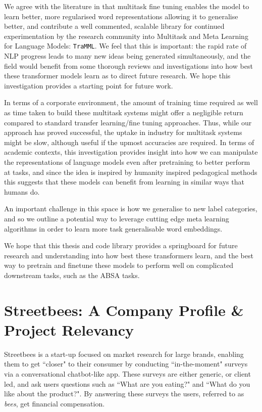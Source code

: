 \documentclass[11pt]{report}
\def \thesistitle {Multitask \& Meta Learning for Language Models}
\renewcommand{\headrulewidth}{0.4pt}
\theoremstyle{Definition}
\theoremstyle{remark}
\begin{document}
We agree with the literature in that multitask fine tuning enables the model to learn better, more regularised word representations allowing it to generalise better, and contribute a well commented, scalable library for continued experimentation by the research community into Multitask and Meta Learning for Language Models: \texttt{TraMML}. We feel that this is important: the rapid rate of NLP progress leads to many new ideas being generated simultaneously, and the field would benefit from some thorough reviews and investigations into how best these transformer models learn as to direct future research. We hope this investigation provides a starting point for future work.

In terms of a corporate environment, the amount of training time required as well as time taken to build these multitask systems might offer a negligible return compared to standard transfer learning/fine tuning approaches. Thus, while our approach has proved successful, the uptake in industry for multitask systems might be slow, although useful if the upmost accuracies are required. In terms of academic contexts, this investigation provides insight into how we can manipulate the representations of language models even after pretraining to better perform at tasks, and since the idea is inspired by humanity inspired pedagogical methods this suggests that these models can benefit from learning in similar ways that humans do.

An important challenge in this space is how we generalise to new label categories, and so we outline a potential way to leverage cutting edge meta learning algorithms in order to learn more task generalisable word embeddings.

We hope that this thesis and code library provides a springboard for future research and understanding into how best these transformers learn, and the best way to pretrain and finetune these models to perform well on complicated downstream tasks, such as the ABSA tasks.

\appendix
\chapter{Streetbees: A Company Profile \& Project Relevancy}
\label{appendix:streetbees}
\fancyhf{}
\fancyhead[R]{\slshape\nouppercase{\thesistitle}}
\renewcommand{\headrulewidth}{0.4pt}
\fancyfoot[C]{\thepage}
Streetbees is a start-up focused on market research for large brands, enabling them to get ``closer" to their consumer by conducting ``in-the-moment" surveys via a conversational chatbot-like app. These surveys are either generic, or client led, and ask users questions such as ``What are you eating?" and ``What do you like about the product?". By answering these surveys the users, referred to as \textit{bees}, get financial compensation. 
\end{document}
